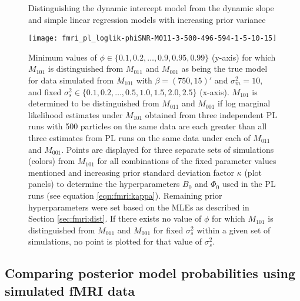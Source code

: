 \begin{figure}
\ssp
\centering
\caption{Distinguishing the dynamic intercept model from the dynamic slope and simple linear regression models with increasing prior variance} \label{fig:fmri:kappa:M101}
\texttt{[image: fmri\_pl\_loglik-phiSNR-M011-3-500-496-594-1-5-10-15]}
\caption*{Minimum values of $\phi \in \{0.1,0.2,\ldots,0.9,0.95,0.99\}$ (y-axis) for which $M_{101}$ is distinguished from $M_{011}$ and $M_{001}$ as being the true model for data simulated from $M_{101}$ with $\beta = (750,15)'$ and $\sigma^2_m = 10$, and fixed $\sigma^2_s \in \{0.1,0.2,\ldots,0.5,1.0,1.5,2.0,2.5\}$ (x-axis). $M_{101}$ is determined to be distinguished from $M_{011}$ and $M_{001}$ if log marginal likelihood estimates under $M_{101}$ obtained from three independent PL runs with 500 particles on the same data are each greater than all three estimates from PL runs on the same data under each of $M_{011}$ and $M_{001}$. Points are displayed for three separate sets of simulations (colors) from $M_{101}$ for all combinations of the fixed parameter values mentioned and increasing prior standard deviation factor $\kappa$ (plot panels) to determine the hyperparameters $B_0$ and $\Phi_0$ used in the PL runs (see equation \eqref{eqn:fmri:kappa}). Remaining prior hyperparameters were set based on the MLEs as described in Section \ref{sec:fmri:dist}. If there exists no value of $\phi$ for which $M_{101}$ is distinguished from $M_{011}$ and $M_{001}$ for fixed $\sigma^2_s$ within a given set of simulations, no point is plotted for that value of $\sigma^2_s$.}
\end{figure}

\subsection{Comparing posterior model probabilities using simulated fMRI data \label{sec:fmri:part}}

